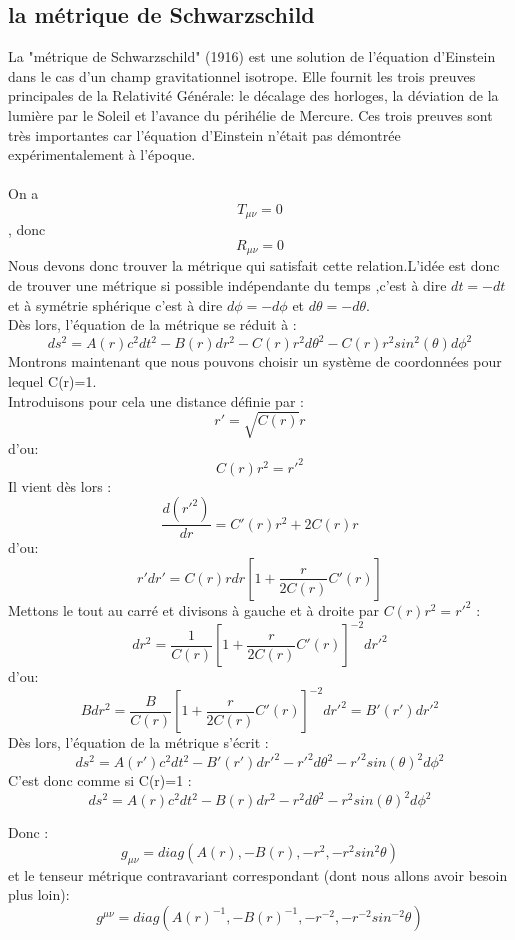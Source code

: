 \documentclass[12pt,  a4paper, openright]{report} %
\begin{document}
	\subsection{ la métrique de Schwarzschild }
	La "métrique de Schwarzschild" (1916) est une solution de l'équation d'Einstein dans le cas d'un champ gravitationnel isotrope. Elle fournit les trois preuves principales de la Relativité Générale: le décalage des horloges, la déviation de la lumière par le Soleil et l'avance du périhélie de Mercure. Ces trois preuves sont très importantes car l'équation d'Einstein n'était pas démontrée expérimentalement à l'époque.\\
	\\
	On a $$T_{\mu\nu}=0$$, donc $$R_{\mu\nu}=0$$ 
	Nous devons donc trouver la métrique qui satisfait cette relation.L'idée est donc de trouver une métrique si possible indépendante du temps ,c'est à dire $ dt=-dt$ et à symétrie sphérique  c'est à dire $d\phi=-d\phi$  et $d\theta=-d\theta$.\\
	Dès lors, l'équation de la métrique se réduit à :
	\begin{equation}
	ds^{2}=A(r)c^{2}dt^{2}-B(r)dr^{2}-C(r)r^{2}d\theta^{2}-C(r)r^{2}sin^{2}(\theta)d\phi^{2}
	\end{equation}
	Montrons maintenant que nous pouvons choisir un système de coordonnées pour lequel C(r)=1.\\
	Introduisons pour cela une distance définie par :\\
	$$r'=\sqrt{C(r)}r$$
	d'ou:\\
	$$C(r)r^{2}=r'^{2}$$
	Il vient dès lors :\\
	$$\dfrac{d(r'^{2})}{dr}=C'(r)r^{2}+2C(r)r$$
	d'ou:\\
	$$r'dr'=C(r)rdr[1+\dfrac{r}{2C(r)}C'(r)]$$
	Mettons le tout au carré et divisons à gauche et à droite par $C(r)r^{2}=r'^{2}$ :
	$$dr^{2}=\dfrac{1}{C(r)}[1+\dfrac{r}{2C(r)}C'(r)]^{-2}dr'^{2}$$
	d'ou:\\
	$$Bdr^{2}=\dfrac{B}{C(r)}[1+\dfrac{r}{2C(r)}C'(r)]^{-2}dr'^{2}=B'(r')dr'^{2}$$
	Dès lors, l'équation de la métrique s'écrit :\\
	$$ds^{2}=A(r')c^{2}dt^{2}-B'(r')dr'^{2}-r'^{2}d\theta^{2}-r'^{2}sin(\theta)^{2}d\phi^{2}$$
	C'est donc comme si C(r)=1 :\\
	\begin{equation}
	ds^{2}=A(r)c^{2}dt^{2}-B(r)dr^{2}-r^{2}d\theta^{2}-r^{2}sin(\theta)^{2}d\phi^{2}
	\end{equation}
	
Donc :
\begin{equation}
g_{\mu\nu}=diag(A(r),-B(r),-r^{2},-r^{2}sin^{2}\theta)
\end{equation}
et le tenseur métrique contravariant correspondant (dont nous allons avoir besoin plus loin):
\begin{equation}
g^{\mu\nu}=diag(A(r)^{-1},-B(r)^{-1},-r^{-2},-r^{-2}sin^{-2}\theta)
\end{equation}
\end{document}
